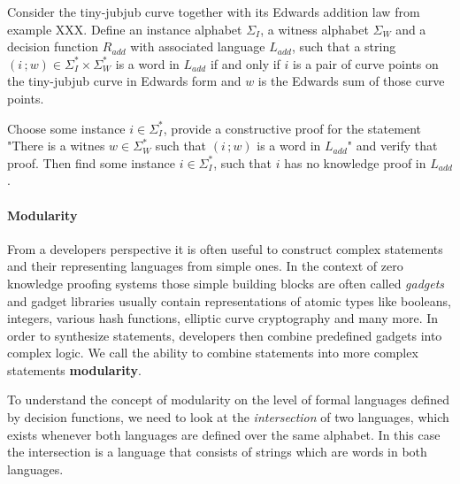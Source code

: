 \begin{exercise} Consider the tiny-jubjub curve together with its Edwards addition law from example XXX. Define an instance alphabet $\Sigma_I$, a witness alphabet $\Sigma_W$ and a decision function $R_{add}$ with associated language $L_{add}$, such that a string $(i\,;w)\in \Sigma_I^* \times \Sigma_W^*$ is a word in $L_{add}$ if and only if $i$ is a pair of curve points on the tiny-jubjub curve in Edwards form and $w$ is the Edwards sum of those curve points.

Choose some instance $i\in \Sigma_I^*$, provide a constructive proof for the statement "There is a witnes $w\in \Sigma_W^*$ such that $(i\,;w)$ is a word in $L_{add}$" and verify that proof. Then find some instance $i\in \Sigma_I^*$, such that $i$ has no knowledge proof in $L_{add}$.
\end{exercise}
\paragraph{Modularity} From a developers perspective it is often useful to construct complex statements and their representing languages from simple ones. In the context of zero knowledge proofing systems those simple building blocks are often called \textit{gadgets} and gadget libraries usually contain representations of atomic types like booleans, integers, various hash functions, elliptic curve cryptography and many more. In order to synthesize statements, developers then combine predefined gadgets into complex logic. We call the ability to combine statements into more complex statements \textbf{modularity}. 

To understand the concept of modularity on the level of formal languages defined by decision functions, we need to look at the \textit{intersection} of two languages, which exists whenever both languages are defined over the same alphabet. In this case the intersection is a language that consists of strings which are words in both languages. 

